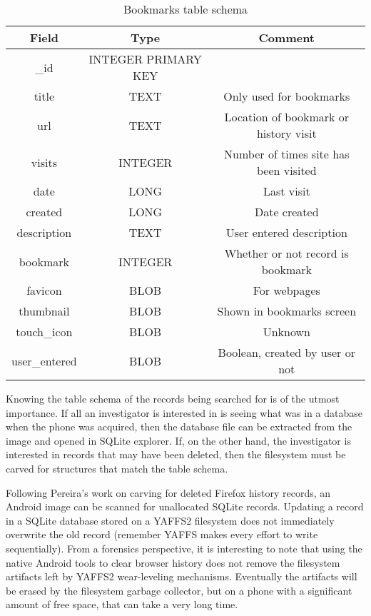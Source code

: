 \begin{table}[htpb]
\begin {center}
	\begin{tabular}{| c | c | c |}
	\hline
	Field & Type & Comment \\
	\hline
	\_id & INTEGER PRIMARY KEY & \\
	title & TEXT  &  Only used for bookmarks \\
	url & TEXT  & Location of bookmark or history visit \\
	visits & INTEGER  & Number of times site has been visited \\
	date & LONG  &  Last visit \\
	created & LONG &  Date created \\
	description & TEXT &  User entered description \\
	bookmark & INTEGER & Whether or not record is bookmark \\
	favicon & BLOB &  For webpages \\
	thumbnail & BLOB &  Shown in bookmarks screen \\
	touch\_icon & BLOB &  Unknown \\
	user\_entered & BLOB & Boolean, created by user or not \\
	\hline
	\end{tabular}
\end{center}
	\caption{Bookmarks table schema}
	\label{tab:bookmarkschema}
\end{table}

Knowing the table schema of the records being searched for is of the utmost importance.  If all an investigator is interested in is
seeing what was in a database when the phone was acquired, then the database file can be extracted from the image and opened in
SQLite explorer.  If, on the other hand, the investigator is interested in records that may have been deleted, then the filesystem
must be carved for structures that match the table schema.

Following Pereira's work on carving for deleted Firefox history records, an Android image can be scanned for unallocated SQLite
records.  Updating a record in a SQLite database stored on a YAFFS2 filesystem does not immediately overwrite the old record
(remember YAFFS makes every effort to write sequentially).  From a forensics perspective, it is interesting to note that using the
native Android tools to clear browser history does not remove the filesystem artifacts left by YAFFS2 wear-leveling mechanisms.
Eventually the artifacts will be erased by the filesystem garbage collector, but on a phone with a significant amount of free space,
that can take a very long time.

